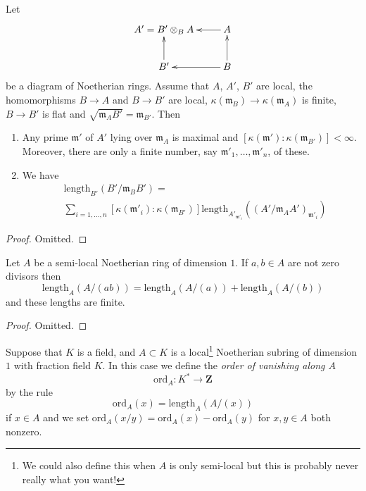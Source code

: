 \begin{lemma}
\label{lemma-flat-pullback-pushdown-module}
Let
$$
\xymatrix{
A' = B' \otimes_B A & A \ar[l] \\
B' \ar[u] & B \ar[l] \ar[u]
}
$$
be a diagram of Noetherian rings. Assume that $A$, $A'$, $B'$ are local,
the homomorphisms $B \to A$ and $B \to B'$ are local,
$\kappa(\mathfrak m_B) \to \kappa(\mathfrak m_A)$ is finite,
$B \to B'$ is flat and $\sqrt{\mathfrak m_A B'} = \mathfrak m_{B'}$.
Then
\begin{enumerate}
\item Any prime $\mathfrak m'$ of $A'$ lying over $\mathfrak m_A$
is maximal and $[\kappa(\mathfrak m') : \kappa(\mathfrak m_{B'})] < \infty$.
Moreover, there are only a finite number, say
$\mathfrak m'_1, \ldots, \mathfrak m'_n$, of these.
\item We have
\begin{align*}
[\kappa(\mathfrak m_A) : \kappa(\mathfrak m_B)]
&
\text{length}_{B'}(B'/\mathfrak m_BB')
= \\
& \sum\nolimits_{i = 1, \ldots, n}
[\kappa(\mathfrak m'_i) : \kappa(\mathfrak m_{B'})]
\text{length}_{A'_{\mathfrak m'_i}}((A'/\mathfrak m_AA')_{\mathfrak m'_i})
\end{align*}
\end{enumerate}
\end{lemma}

\begin{proof}
Omitted.
\end{proof}

\begin{lemma}
\label{lemma-length-additive}
Let $A$ be a semi-local Noetherian ring of dimension $1$.
If $a, b \in A$ are not zero divisors then
$$
\text{length}_A(A/(ab)) =
\text{length}_A(A/(a)) +
\text{length}_A(A/(b))
$$
and these lengths are finite.
\end{lemma}

\begin{proof}
Omitted.
\end{proof}

\begin{definition}
\label{definition-ord}
Suppose that $K$ is a field, and $A \subset K$ is a
local\footnote{We could also define this when $A$ is only
semi-local but this is probably never really what you want!}
Noetherian subring of dimension $1$ with fraction field $K$.
In this case we define the {\it order of vanishing along $A$}
$$
\text{ord}_A : K^* \longrightarrow \mathbf{Z}
$$
by the rule
$$
\text{ord}_A(x) = \text{length}_A(A/(x))
$$
if $x \in A$ and we set
$\text{ord}_A(x/y) = \text{ord}_A(x) - \text{ord}_A(y)$
for $x, y \in A$ both nonzero.
\end{definition}


